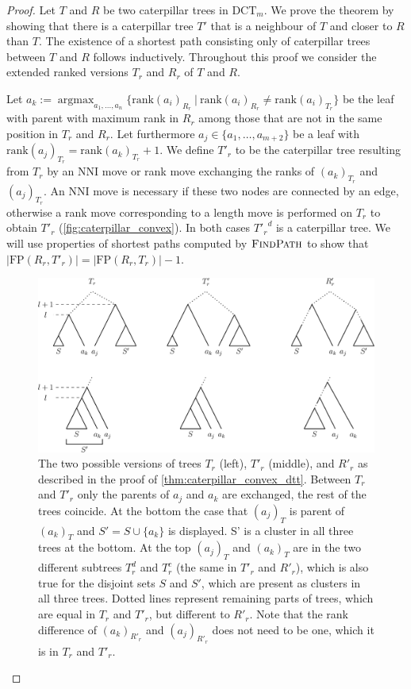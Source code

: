 \documentclass[11pt]{amsart}
\newcommand{\findpath}{\textsc{FindPath}}
\newcommand{\rank}{\mathrm{rank}}
\newcommand{\nni}{\mathrm{NNI}}
\newcommand{\fp}{\mathrm{FP}}
\newcommand{\dtt}{\mathrm{DCT}}
\DeclareMathOperator*{\argmax}{argmax}
\begin{document}
\begin{proof}
	Let $T$ and $R$ be two caterpillar trees in $\dtt_m$.
	We prove the theorem by showing that there is a caterpillar tree $T'$ that is a neighbour of $T$ and closer to $R$ than $T$.
	The existence of a shortest path consisting only of caterpillar trees between $T$ and $R$ follows inductively.
	Throughout this proof we consider the extended ranked versions $T_r$ and $R_r$ of $T$ and $R$.

	Let $a_k := \argmax_{a_1, \ldots, a_n}\{\rank(a_i)_{R_r} \ |\  \rank(a_i)_{R_r} \neq \rank(a_i)_{T_r}\}$ be the leaf with parent with maximum rank in $R_r$ among those that are not in the same position in $T_r$ and $R_r$.
	Let furthermore $a_j \in \{a_1, \ldots, a_{m+2}\}$ be a leaf with $\rank(a_j)_{T_r} = \rank(a_k)_{T_r} + 1$.
	We define $T'_r$ to be the caterpillar tree resulting from $T_r$ by an $\nni$ move or rank move exchanging the ranks of $(a_k)_{T_r}$ and $(a_j)_{T_r}$.
	An $\nni$ move is necessary if these two nodes are connected by an edge, otherwise a rank move corresponding to a length move is performed on $T_r$ to obtain $T'_r$ (\autoref{fig:caterpillar_convex}).
	In both cases ${T'_r}^d$ is a caterpillar tree.
	We will use properties of shortest paths computed by $\findpath$ to show that $|\fp(R_r,T'_r)| = |\fp(R_r,T_r)| - 1$.

	\begin{figure}[ht]
		\includegraphics[width=1\textwidth]{caterpillar_convex.eps}
		\caption{The two possible versions of trees $T_r$ (left), $T'_r$ (middle), and $R'_r$ as described in the proof of \autoref{thm:caterpillar_convex_dtt}.
		Between $T_r$ and $T'_r$ only the parents of $a_j$ and $a_k$ are exchanged, the rest of the trees coincide.
		At the bottom the case that $(a_j)_T$ is parent of $(a_k)_T$ and $S' = S \cup \{a_k\}$ is displayed.
		S' is a cluster in all three trees at the bottom.
		At the top $(a_j)_T$ and $(a_k)_T$ are in the two different subtrees $T_r^d$ and $T_r^c$ (the same in $T'_r$ and $R'_r$), which is also true for the disjoint sets $S$ and $S'$, which are present as clusters in all three trees.
		Dotted lines represent remaining parts of trees, which are equal in $T_r$ and $T'_r$, but different to $R'_r$.
		Note that the rank difference of $(a_k)_{R'_r}$ and $(a_j)_{R'_r}$ does not need to be one, which it is in $T_r$ and $T'_r$.
		\label{fig:caterpillar_convex}}
	\end{figure}


\end{proof}
\end{document}
